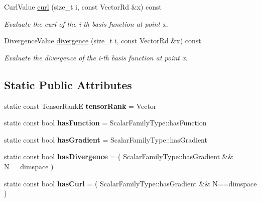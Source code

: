 \begin{DoxyCompactItemize}
Curl\+Value \hyperlink{classHArDCore2D_1_1TensorizedVectorFamily_a187befd7daa85ec049e41706ea1d5de2}{curl} (size\+\_\+t i, const Vector\+Rd \&x) const
\begin{DoxyCompactList}\small\item\em Evaluate the curl of the i-\/th basis function at point x. \end{DoxyCompactList}\item 
\mbox{\label{classHArDCore2D_1_1TensorizedVectorFamily_a6e852fda44755e4ca0a8ffac94d97d16}} 
Divergence\+Value \hyperlink{classHArDCore2D_1_1TensorizedVectorFamily_a6e852fda44755e4ca0a8ffac94d97d16}{divergence} (size\+\_\+t i, const Vector\+Rd \&x) const
\begin{DoxyCompactList}\small\item\em Evaluate the divergence of the i-\/th basis function at point x. \end{DoxyCompactList}\end{DoxyCompactItemize}
\subsection*{Static Public Attributes}
\begin{DoxyCompactItemize}
\item 
\mbox{\label{classHArDCore2D_1_1TensorizedVectorFamily_aada1d8a90047badc9910b9b312e6300e}} 
static const Tensor\+RankE {\bfseries tensor\+Rank} = Vector
\item 
\mbox{\label{classHArDCore2D_1_1TensorizedVectorFamily_a11bea467eab12156126ffc5d296ffecc}} 
static const bool {\bfseries has\+Function} = Scalar\+Family\+Type\+::has\+Function
\item 
\mbox{\label{classHArDCore2D_1_1TensorizedVectorFamily_a118c8e9bbbe5d63d2ce9575adf4e02eb}} 
static const bool {\bfseries has\+Gradient} = Scalar\+Family\+Type\+::has\+Gradient
\item 
\mbox{\label{classHArDCore2D_1_1TensorizedVectorFamily_a67fc626998e10c80c40b9419e013e538}} 
static const bool {\bfseries has\+Divergence} = ( Scalar\+Family\+Type\+::has\+Gradient \&\& N==dimspace )
\item 
\mbox{\label{classHArDCore2D_1_1TensorizedVectorFamily_a440a12913a7f63653b9766e4180c5884}} 
static const bool {\bfseries has\+Curl} = ( Scalar\+Family\+Type\+::has\+Gradient \&\& N==dimspace )
\end{DoxyCompactItemize}


